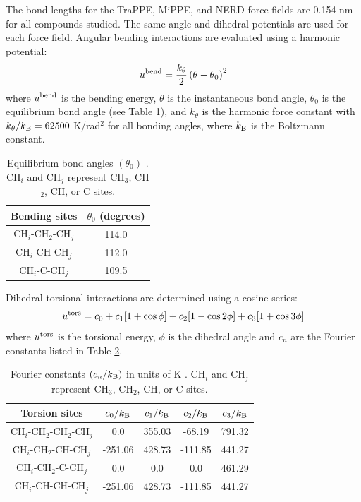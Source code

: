 \documentclass[journal=jced,manuscript=article]{achemso}
\begin{document}
    The bond lengths for the TraPPE, MiPPE, and NERD force fields are 0.154 nm for all compounds studied. The same angle and dihedral potentials are used for each force field. Angular bending interactions are evaluated using a harmonic potential:
    \begin{equation}
    u^{\rm bend} = \frac{k_\theta}{2} \left(\theta-\theta_0\right)^2
    \end{equation}
    where $u^{\rm bend}$ is the bending energy, $\theta$ is the instantaneous bond angle, $\theta_0$ is the equilibrium bond angle (see Table \ref{tab:angles}), and $k_\theta$ is the harmonic force constant with $k_\theta/k_{\rm B} = 62500$ K/rad$^2$ for all bonding angles, where $k_{\rm B}$ is the Boltzmann constant. 
    
    \begin{table}[h!]
    	\caption{Equilibrium bond angles $(\theta_0)$ \cite{Martin1999}. CH$_i$ and CH$_j$ represent CH$_3$, CH$_2$, CH, or C sites.} \label{tab:angles}
    	\begin{center}
    		\begin{tabular}{|c|c|}
    			\hline
    			Bending sites & $\theta_0$ (degrees) \\ \hline
    			CH$_i$-CH$_2$-CH$_j$ & 114.0 \\ 
    			CH$_i$-CH-CH$_j$ & 112.0 \\ 
    			CH$_i$-C-CH$_j$ & 109.5 \\  
    			\hline
    		\end{tabular}
    	\end{center} 
    \end{table}
    
    Dihedral torsional interactions are determined using a cosine series:
    \begin{equation}
    u^{\rm tors} = c_0 + c_1 [1+\cos{\phi}] + c_2 [1-\cos{2\phi}] + c_3 [1+\cos{3\phi}]
    \end{equation}
    where $u^{\rm tors}$ is the torsional energy, $\phi$ is the dihedral angle and $c_n$ are the Fourier constants listed in Table \ref{tab:torsions}.
    
    \begin{table}[h!]
    	\caption{Fourier constants $(c_n/k_{\rm B})$ in units of K \cite{Martin1999}. CH$_i$ and CH$_j$ represent CH$_3$, CH$_2$, CH, or C sites.} \label{tab:torsions}
    	\begin{center}
    		\begin{tabular}{|c|c|c|c|c|}
    			\hline
    			Torsion sites & $c_0/k_{\rm B}$ & $c_1/k_{\rm B}$ & $c_2/k_{\rm B}$ & $c_3/k_{\rm B}$ \\ \hline
    			CH$_i$-CH$_2$-CH$_2$-CH$_j$ & 0.0 & 355.03 & -68.19 & 791.32 \\ 
    			CH$_i$-CH$_2$-CH-CH$_j$ & -251.06 & 428.73 & -111.85 & 441.27 \\
    			CH$_i$-CH$_2$-C-CH$_j$ & 0.0 & 0.0 & 0.0 & 461.29 \\
    			CH$_i$-CH-CH-CH$_j$ & -251.06 & 428.73 & -111.85 & 441.27 \\
    			\hline
    		\end{tabular}
    	\end{center} 
    \end{table}
    
\end{document}
